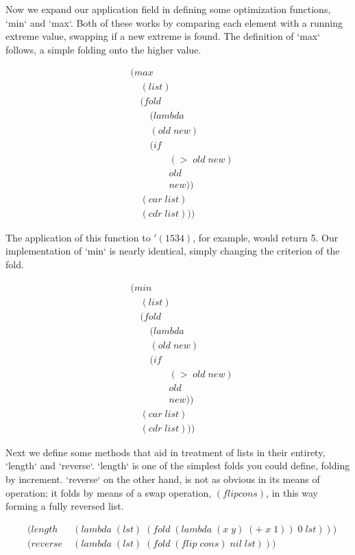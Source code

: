 Now we expand our application field in defining some optimization functions, `min` 
and `max`. Both of these works by comparing each element with a running extreme 
value, swapping if a new extreme is found. The definition of `max` follows, a 
simple folding onto the higher value.

\begin{align*}
& (max \; 
\\& \quad (list)
\\& \quad (fold \; 
\\& \qquad (lambda \; 
\\& \qquad (old \; new)
\\& \qquad (if
\\& \qquad \qquad (> \; old \; new)
\\& \qquad \qquad old
\\& \qquad \qquad new))
\\& \quad (car \; list)
\\& \quad (cdr \; list)))
\end{align*}

The application of this function to $'(1 5 3 4)$, for example, would return 5. Our 
implementation of `min` is nearly identical, simply changing the criterion of the 
fold.

\begin{align*}
& (min \; 
\\& \quad (list)
\\& \quad (fold \; 
\\& \qquad (lambda \; 
\\& \qquad (old \; new)
\\& \qquad (if
\\& \qquad \qquad (> \; old \; new)
\\& \qquad \qquad old
\\& \qquad \qquad new))
\\& \quad (car \; list)
\\& \quad (cdr \; list)))
\end{align*}

Next we define some methods that aid in treatment of lists in their entirety, 
`length` and `reverse`. `length` is one of the simplest folds you could define, 
folding by increment. `reverse` on the other hand, is not as obvious in its means 
of operation; it folds by means of a swap operation, $(flip cons)$, in this way 
forming a fully reversed list.

\begin{align*}
& (length \; &(lambda \; (lst) \; (fold \; (lambda \; (x \; y) \; (+ \; x \; 1)) \; 0 \; lst)))
\\& (reverse \; &(lambda \; (lst) \; (fold \; (flip \; cons) \; nil \; lst)))
\end{align*}

